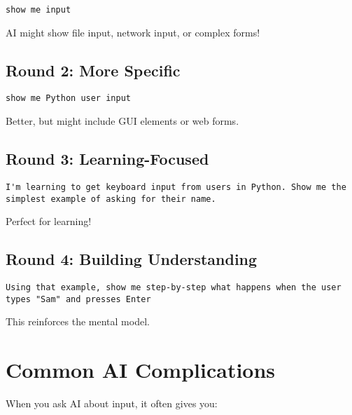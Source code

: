 \documentclass[
  letterpaper,
  DIV=11,
  numbers=noendperiod,
  oneside]{scrreprt}
\begin{document}
\begin{verbatim}
show me input
\end{verbatim}

AI might show file input, network input, or complex forms!

\subsection{Round 2: More Specific}\label{round-2-more-specific-1}

\begin{verbatim}
show me Python user input
\end{verbatim}

Better, but might include GUI elements or web forms.

\subsection{Round 3: Learning-Focused}\label{round-3-learning-focused-2}

\begin{verbatim}
I'm learning to get keyboard input from users in Python. Show me the simplest example of asking for their name.
\end{verbatim}

Perfect for learning!

\subsection{Round 4: Building
Understanding}\label{round-4-building-understanding-1}

\begin{verbatim}
Using that example, show me step-by-step what happens when the user types "Sam" and presses Enter
\end{verbatim}

This reinforces the mental model.

\section{Common AI Complications}\label{common-ai-complications-2}

When you ask AI about input, it often gives you:
\end{document}
